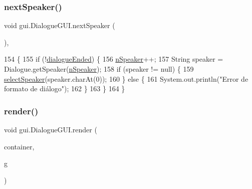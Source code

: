 \subsubsection{\texorpdfstring{next\+Speaker()}{nextSpeaker()}}
{\footnotesize\ttfamily void gui.\+Dialogue\+G\+U\+I.\+next\+Speaker (\begin{DoxyParamCaption}{ }\end{DoxyParamCaption})\hspace{0.3cm}{\ttfamily [inline]}, {\ttfamily [private]}}


\begin{DoxyCode}
154                                \{
155         \textcolor{keywordflow}{if} (!\mbox{\hyperlink{classgui_1_1_dialogue_g_u_i_a0ce37741e9f2b0ad3a749977fe9a1477}{dialogueEnded}}) \{
156             \mbox{\hyperlink{classgui_1_1_dialogue_g_u_i_ac78eeb2127202391a39c827cee6dfd2f}{nSpeaker}}++;
157             String speaker = Dialogue.getSpeaker(\mbox{\hyperlink{classgui_1_1_dialogue_g_u_i_ac78eeb2127202391a39c827cee6dfd2f}{nSpeaker}});
158             \textcolor{keywordflow}{if} (speaker != null) \{
159                 \mbox{\hyperlink{classgui_1_1_dialogue_g_u_i_a69d754e37de68f81fdffadda6b4c8b63}{selectSpeaker}}(speaker.charAt(0));
160             \} \textcolor{keywordflow}{else} \{
161                 System.out.println(\textcolor{stringliteral}{"Error de formato de diálogo"});
162             \}
163         \}
164     \}
\end{DoxyCode}
\mbox{\label{classgui_1_1_dialogue_g_u_i_a2163a61f391f8c158ae232af0ec7467d}} 
\subsubsection{\texorpdfstring{render()}{render()}}
{\footnotesize\ttfamily void gui.\+Dialogue\+G\+U\+I.\+render (\begin{DoxyParamCaption}\item[{\mbox{\hyperlink{interfaceorg_1_1newdawn_1_1slick_1_1gui_1_1_g_u_i_context}{G\+U\+I\+Context}}}]{container,  }\item[{\mbox{\hyperlink{classorg_1_1newdawn_1_1slick_1_1_graphics}{Graphics}}}]{g }\end{DoxyParamCaption})\hspace{0.3cm}{\ttfamily [inline]}}


